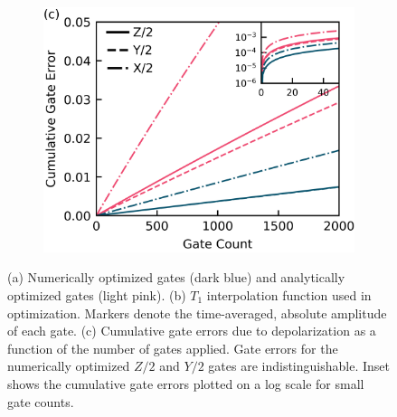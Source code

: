 \begin{figure}[ht]
\begin{subfigure}{.23\textwidth}
    \caption{\label{fig:longitudeb}}
  \end{subfigure}\hfill
  \begin{subfigure}{.4\textwidth}
    \includegraphics[width=\linewidth]{assets/f1c.png}
    \caption{\label{fig:longitudec}}
  \end{subfigure}
  \caption{
    (a) Numerically optimized gates (dark blue)
    and analytically optimized gates (light pink).
    (b) $T_{1}$ interpolation function used in optimization. Markers
    denote the time-averaged, absolute amplitude of each gate.
    (c) Cumulative gate errors due to depolarization as a function of the
    number of gates applied.
    Gate errors for the numerically optimized $Z/2$ and $Y/2$ gates
    are indistinguishable. Inset shows the cumulative gate errors
    plotted on a log scale for small gate counts.
  }
  \label{fig:longitude}
\end{figure}

